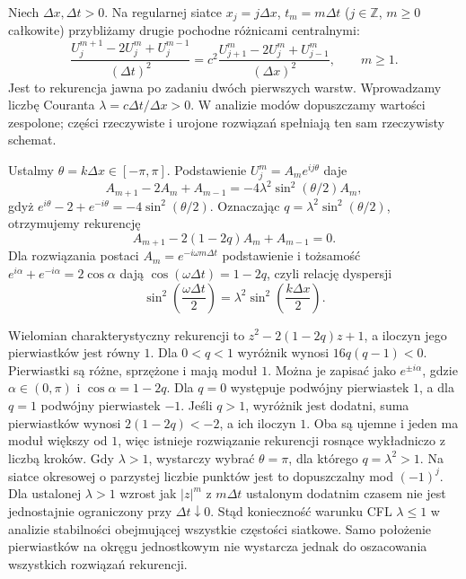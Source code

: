 Niech $\Delta x,\Delta t>0$. Na regularnej siatce
$x_j=j\Delta x$, $t_m=m\Delta t$ ($j\in\mathbb Z$,
$m\geq0$ całkowite) przybliżamy drugie pochodne
różnicami centralnymi:
\begin{equation}\label{eq:pde5-leapfrog}
 \frac{U_j^{m+1}-2U_j^m+U_j^{m-1}}{(\Delta t)^2}
 =c^2\frac{U_{j+1}^m-2U_j^m+U_{j-1}^m}{(\Delta x)^2},
 \qquad m\geq1.
\end{equation}
Jest to rekurencja jawna po zadaniu dwóch
pierwszych warstw. Wprowadzamy liczbę Couranta
$\lambda=c\Delta t/\Delta x>0$.
W analizie modów dopuszczamy wartości zespolone;
części rzeczywiste i urojone rozwiązań spełniają
ten sam rzeczywisty schemat.

Ustalmy $\theta=k\Delta x\in[-\pi,\pi]$.
Podstawienie $U_j^m=A_m e^{ij\theta}$ daje
\[
 A_{m+1}-2A_m+A_{m-1}
 =-4\lambda^2\sin^2(\theta/2)A_m,
\]
gdyż $e^{i\theta}-2+e^{-i\theta}=-4\sin^2(\theta/2)$.
Oznaczając $q=\lambda^2\sin^2(\theta/2)$,
otrzymujemy rekurencję
\[
 A_{m+1}-2(1-2q)A_m+A_{m-1}=0.
\]
Dla rozwiązania postaci $A_m=e^{-i\omega m\Delta t}$
podstawienie i tożsamość
$e^{i\alpha}+e^{-i\alpha}=2\cos\alpha$ dają
$\cos(\omega\Delta t)=1-2q$, czyli relację
dyspersji
\begin{equation}\label{eq:pde5-cfl}
 \sin^2\!\left(\frac{\omega\Delta t}2\right)
 =\lambda^2\sin^2\!\left(\frac{k\Delta x}2\right).
\end{equation}

Wielomian charakterystyczny rekurencji to
$z^2-2(1-2q)z+1$, a iloczyn jego pierwiastków
jest równy $1$.
Dla $0<q<1$ wyróżnik wynosi $16q(q-1)<0$.
Pierwiastki są różne, sprzężone i mają moduł $1$.
Można je zapisać jako $e^{\pm i\alpha}$,
gdzie $\alpha\in(0,\pi)$ i $\cos\alpha=1-2q$.
Dla $q=0$ występuje podwójny pierwiastek $1$,
a dla $q=1$ podwójny pierwiastek $-1$.
Jeśli $q>1$, wyróżnik jest dodatni, suma
pierwiastków wynosi $2(1-2q)<-2$, a ich
iloczyn $1$. Oba są ujemne i jeden ma moduł
większy od $1$, więc istnieje rozwiązanie
rekurencji rosnące wykładniczo z liczbą kroków.
Gdy $\lambda>1$, wystarczy wybrać $\theta=\pi$,
dla którego $q=\lambda^2>1$.
Na siatce okresowej o parzystej liczbie punktów
jest to dopuszczalny mod $(-1)^j$.
Dla ustalonej $\lambda>1$ wzrost jak $|z|^m$
z $m\Delta t$ ustalonym dodatnim czasem
nie jest jednostajnie ograniczony przy
$\Delta t\downarrow0$.
Stąd konieczność warunku CFL
$\lambda\leq1$ w analizie stabilności
obejmującej wszystkie częstości siatkowe.
Samo położenie pierwiastków na okręgu
jednostkowym nie wystarcza jednak do
oszacowania wszystkich rozwiązań rekurencji.


